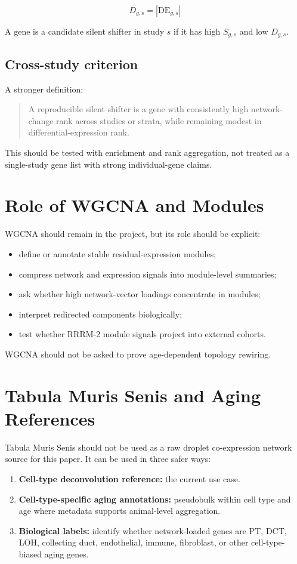 \documentclass[11pt]{article}
\begin{document}
\[
D_{g,s} = |\mathrm{DE}_{g,s}|
\]

A gene is a candidate silent shifter in study $s$ if it has high $S_{g,s}$ and
low $D_{g,s}$.

\subsection{Cross-study criterion}

A stronger definition:

\begin{quote}
A reproducible silent shifter is a gene with consistently high network-change
rank across studies or strata, while remaining modest in differential-expression
rank.
\end{quote}

This should be tested with enrichment and rank aggregation, not treated as a
single-study gene list with strong individual-gene claims.

\section{Role of WGCNA and Modules}

WGCNA should remain in the project, but its role should be explicit:

\begin{itemize}
  \item define or annotate stable residual-expression modules;
  \item compress network and expression signals into module-level summaries;
  \item ask whether high network-vector loadings concentrate in modules;
  \item interpret redirected components biologically;
  \item test whether RRRM-2 module signals project into external cohorts.
\end{itemize}

WGCNA should not be asked to prove age-dependent topology rewiring.

\section{Tabula Muris Senis and Aging References}

Tabula Muris Senis should not be used as a raw droplet co-expression network
source for this paper. It can be used in three safer ways:

\begin{enumerate}
  \item \textbf{Cell-type deconvolution reference:} the current use case.
  \item \textbf{Cell-type-specific aging annotations:} pseudobulk within cell
        type and age where metadata supports animal-level aggregation.
  \item \textbf{Biological labels:} identify whether network-loaded genes are PT,
        DCT, LOH, collecting duct, endothelial, immune, fibroblast, or other
        cell-type-biased aging genes.
\end{enumerate}
\end{document}
